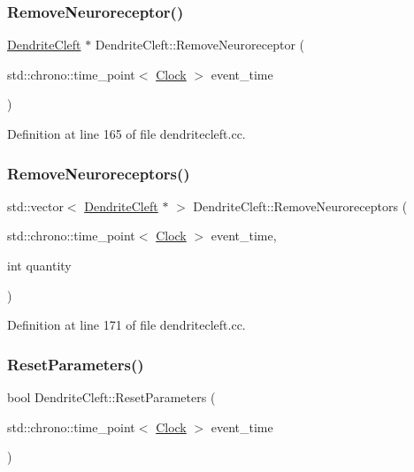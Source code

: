 \subsubsection{\texorpdfstring{Remove\+Neuroreceptor()}{RemoveNeuroreceptor()}}
{\footnotesize\ttfamily \mbox{\hyperlink{class_dendrite_cleft}{Dendrite\+Cleft}} $\ast$ Dendrite\+Cleft\+::\+Remove\+Neuroreceptor (\begin{DoxyParamCaption}\item[{std\+::chrono\+::time\+\_\+point$<$ \mbox{\hyperlink{universe_8h_a0ef8d951d1ca5ab3cfaf7ab4c7a6fd80}{Clock}} $>$}]{event\+\_\+time }\end{DoxyParamCaption})}



Definition at line 165 of file dendritecleft.\+cc.

\mbox{\label{class_dendrite_cleft_ac29b12d4abcc47fa298ab9e95f578f0e}} 
\subsubsection{\texorpdfstring{Remove\+Neuroreceptors()}{RemoveNeuroreceptors()}}
{\footnotesize\ttfamily std\+::vector$<$ \mbox{\hyperlink{class_dendrite_cleft}{Dendrite\+Cleft}} $\ast$ $>$ Dendrite\+Cleft\+::\+Remove\+Neuroreceptors (\begin{DoxyParamCaption}\item[{std\+::chrono\+::time\+\_\+point$<$ \mbox{\hyperlink{universe_8h_a0ef8d951d1ca5ab3cfaf7ab4c7a6fd80}{Clock}} $>$}]{event\+\_\+time,  }\item[{int}]{quantity }\end{DoxyParamCaption})}



Definition at line 171 of file dendritecleft.\+cc.

\mbox{\label{class_dendrite_cleft_a3fee388d7023cfb460412e0322244ae2}} 
\subsubsection{\texorpdfstring{Reset\+Parameters()}{ResetParameters()}}
{\footnotesize\ttfamily bool Dendrite\+Cleft\+::\+Reset\+Parameters (\begin{DoxyParamCaption}\item[{std\+::chrono\+::time\+\_\+point$<$ \mbox{\hyperlink{universe_8h_a0ef8d951d1ca5ab3cfaf7ab4c7a6fd80}{Clock}} $>$}]{event\+\_\+time }\end{DoxyParamCaption})}



